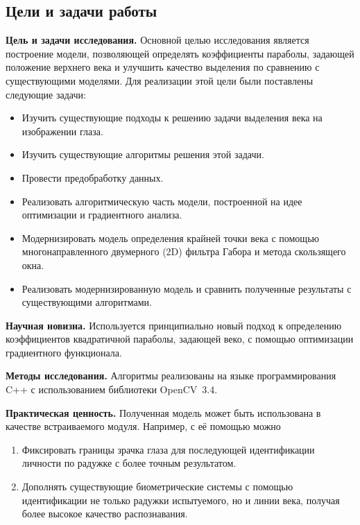 \documentclass[12pt]{article} %
\begin{document}
\newpage
\subsection{Цели и задачи работы}

\textbf{Цель и задачи исследования.} Основной целью исследования является построение модели, позволяющей определять коэффициенты параболы, задающей положение верхнего века и улучшить качество выделения по сравнению с существующими моделями. Для реализации этой цели были поставлены следующие задачи:
\begin{itemize}
	\item Изучить существующие подходы к решению задачи выделения века на изображении глаза.
	\item Изучить существующие алгоритмы решения этой задачи.
	\item Провести предобработку данных.
	\item Реализовать алгоритмическую часть модели, построенной на идее оптимизации и градиентного анализа.
	\item Модернизировать модель определения крайней точки века с помощью многонаправленного двумерного (2D) фильтра Габора и метода скользящего окна. 
	\item Реализовать модернизированную модель и сравнить полученные результаты с существующими алгоритмами.
\end{itemize}

\bigskip

\textbf{Научная новизна.} Используется принципиально новый подход к определению коэффициентов квадратичной параболы, задающей веко, с помощью оптимизации градиентного функционала.

\bigskip

\textbf{Методы исследования.} Алгоритмы реализованы на языке программирования C++ с использованием библиотеки OpenCV~3.4.

\bigskip

\textbf{Практическая ценность.} Полученная модель может быть использована в качестве встраиваемого модуля. Например, с её помощью можно
\begin{enumerate}
	\item Фиксировать границы зрачка глаза для последующей идентификации личности по радужке с более точным результатом.
	\item Дополнять существующие биометрические системы с помощью идентификации не только радужки испытуемого, но и линии века, получая более высокое качество распознавания.
\end{enumerate}
\end{document}
